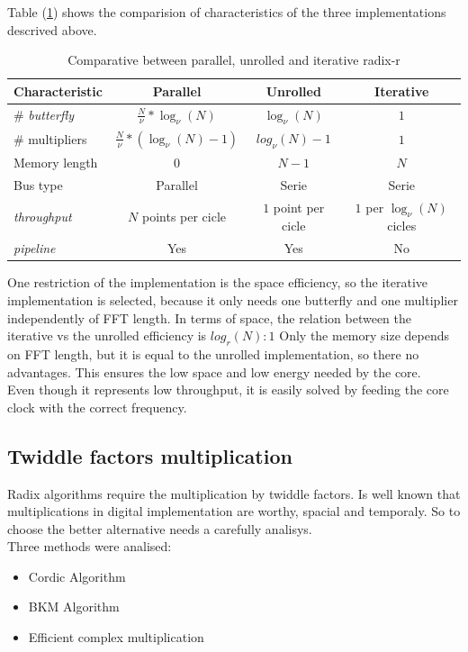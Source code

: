 \documentclass[conference]{IEEEtran}
\begin{document}
Table (\ref{table:radixcomp}) shows the comparision of characteristics of the three implementations descrived above.

\begin{table}[htb!]
\centering
\begin{tabular}{l c c c}
\textbf{Characteristic} & \textbf{Parallel} & \textbf{Unrolled} &
\textbf{Iterative}\\
\hline 
\# \textit{butterfly} & $\frac{N}{\nu}*\log_\nu(N)$ & $\log_\nu(N)$ & $1$ \\
\# multipliers & $\frac{N}{\nu}*(\log_\nu(N)-1)$ & $log_\nu(N)-1$ & $1$ \\
Memory length & $0$ & $N-1$ & $N$ \\
Bus type & Parallel & Serie & Serie \\
\textit{throughput} & $N$ points per cicle & $1$ point per cicle & $1$ per $\log_\nu(N)$
cicles\\
\textit{pipeline} & Yes & Yes & No\\
\hline
\end{tabular}
\caption{Comparative between parallel, unrolled and iterative radix-r}
\label{table:radixcomp}
\end{table}

One restriction of the implementation is the space efficiency, so the iterative implementation is selected, because it only needs
one butterfly and one multiplier independently of FFT length. In terms of space, the relation between the iterative vs the unrolled 
efficiency is $log_r(N):1$ Only the memory size depends on FFT length, but it is equal to the 
unrolled implementation, so there no advantages. This ensures the low space and low energy needed by the core.\\
Even though it represents low throughput, it is easily solved by feeding the core clock with the correct frequency.\\

\subsection{Twiddle factors multiplication}

Radix algorithms require the multiplication by twiddle factors. Is well known that multiplications in digital implementation are worthy, 
spacial and temporaly. So to choose the better alternative needs a carefully analisys.\\

Three methods were analised:
\begin{itemize}
  \item Cordic Algorithm
  \item BKM Algorithm
  \item Efficient complex multiplication
\end{itemize}
\end{document}
